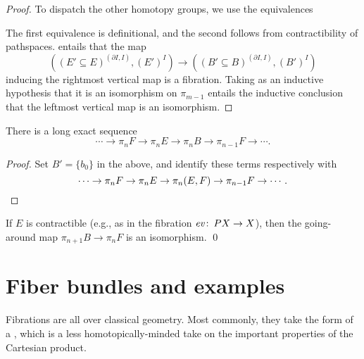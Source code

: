 \begin{proof}
To dispatch the other homotopy groups, we use the equivalences
\begin{center}
\end{center}
The first equivalence is definitional, and the second follows from contractibility of pathspaces.
 entails that the map \[((E' \subseteq E)^{(\partial I, I)}, (E')^I) \to ((B' \subseteq B)^{(\partial I, I)}, (B')^I)\] inducing the rightmost vertical map is a fibration.  Taking as an inductive hypothesis that it is an isomorphism on $\pi_{m-1}$ entails the inductive conclusion that the leftmost vertical map is an isomorphism.
\end{proof}

\begin{corollary}
There is a long exact sequence \[\cdots \to \pi_n F \to \pi_n E \to \pi_n B \to \pi_{n-1} F \to \cdots.\]
\end{corollary}
\begin{proof}
Set $B' = \{b_0\}$ in the above, and identify these terms respectively with \[\cdots \to \pi_n F \to \pi_n E \to \pi_n(E, F) \to \pi_{n-1} F \to \cdots. \qedhere\]
\end{proof}

\begin{corollary}\label{LoopsShiftsPi}
If $E$ is contractible (e.g., as in the fibration $\mathit{ev}\colon\thinspace PX \to X$), then the going-around map $\pi_{n+1} B \to \pi_n F$ is an isomorphism. \qed
\end{corollary}




\section{Fiber bundles and examples}

Fibrations are all over classical geometry.
Most commonly, they take the form of a , which is a less homotopically-minded take on the important properties of the Cartesian product.

